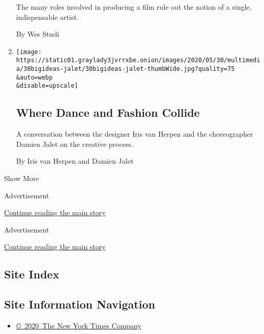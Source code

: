 \begin{enumerate}
  The many roles involved in producing a film rule out the notion of a
  single, indispensable artist.

  By Wes Studi
\item
  \href{/2020/05/30/opinion/dance-fashion-herpen-jalet.html}{}

  \texttt{[image: https://static01.graylady3jvrrxbe.onion/images/2020/05/30/multimedia/30bigideas-jalet/30bigideas-jalet-thumbWide.jpg?quality=75\\\&auto=webp\\\&disable=upscale]}

  \hypertarget{where-dance-and-fashion-collide}{%
  \subsection{Where Dance and Fashion
  Collide}\label{where-dance-and-fashion-collide}}

  A conversation between the designer Iris van Herpen and the
  choreographer Damien Jalet on the creative process.

  By Iris van Herpen and Damien Jalet
\end{enumerate}

Show More

Advertisement

\protect\hyperlink{after-mid1}{Continue reading the main story}

Advertisement

\protect\hyperlink{after-mktg}{Continue reading the main story}

\hypertarget{site-index}{%
\subsection{Site Index}\label{site-index}}

\hypertarget{site-information-navigation}{%
\subsection{Site Information
Navigation}\label{site-information-navigation}}

\begin{itemize}
\tightlist
\item
  \href{https://help.nytimes3xbfgragh.onion/hc/en-us/articles/115014792127-Copyright-notice}{©~2020~The
  New York Times Company}
\end{itemize}

